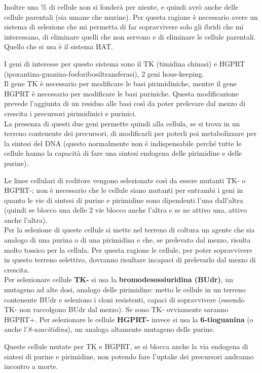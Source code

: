 \documentclass[11pt]{book}
\begin{document}
Inoltre una \% di cellule non si fonderà per niente, e quindi avrò anche delle cellule parentali (sia umane che murine). Per questa ragione è necessario avere un sistema di selezione che mi permetta di far sopravvivere solo gli ibridi che mi interessano, di eliminare quelli che non servono e di eliminare le cellule parentali. Quello che si usa è il sistema HAT.

I geni di interesse per questo sistema sono il TK (timidina chinasi) e HGPRT (ipoxantina-guanina-fosforibosiltransferasi), 2 geni hous-keeping.\\
Il gene TK è necessario per modificare le basi pirimidiniche, mentre il gene HGPRT è necessario per modificare le basi puriniche. Questa modificazione prevede l’aggiunta di un residuo alle basi così da poter prelevare dal mezzo di crescita i precursori pirimidinici e purinici.\\
La presenza di questi due geni permette quindi alla cellula, se si trova in un terreno contenente dei precursori, di modificarli per poterli poi metabolizzare per la sintesi del DNA (questo normalmente non è indispensabile perché tutte le cellule hanno la capacità di fare una sintesi endogena delle pirimidine e delle purine).

Le linee cellulari di roditore vengono selezionate così da essere mutanti TK- o HGPRT-; non è necessario che le cellule siano mutanti per entrambi i geni in quanto le vie di sintesi di purine e pirimidine sono dipendenti l’una dall’altra (quindi se blocco una delle 2 vie blocco anche l’altra e se ne attivo una, attivo anche l’altra).\\
Per la selezione di queste cellule si mette nel terreno di coltura un agente che sia analogo di una purina o di una pirimidina e che, se prelevato dal mezzo, risulta molto tossico per la cellula. Per questa ragione le cellule, per poter sopravvivere in questo terreno selettivo, dovranno risultare incapaci di prelevarlo dal mezzo di crescita.\\
Per selezionare cellule \textbf{TK-} si usa la \textbf{bromodesossiuridina (BUdr)}, un mutageno ad alte dosi, analogo delle pirimidine: metto le cellule in un terreno contenente BUdr e seleziono i cloni resistenti, capaci di sopravvivere (essendo TK- non raccolgono BUdr dal mezzo). Se sono TK- ovviamente saranno HGPRT+.
Per selezionare le cellule \textbf{HGPRT-} invece si usa la \textbf{6-tioguanina} (o anche l’\emph{8-azacitidina}), un analogo altamente mutageno delle purine.

Queste cellule mutate per TK e HGPRT, se si blocca anche la via endogena di sintesi di purine e pirimidine, non potendo fare l'uptake dei precursori andranno incontro a morte.
\end{document}
